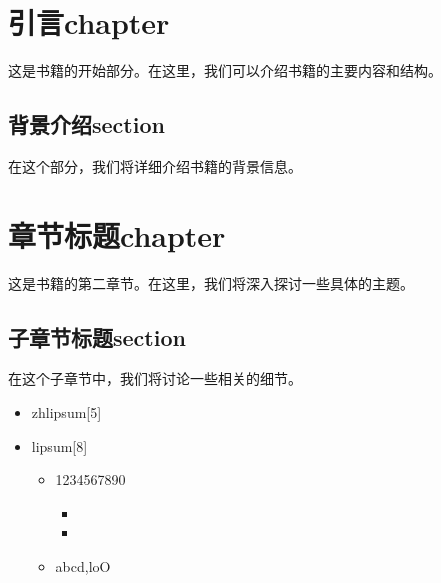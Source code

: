 \documentclass{styles/kaobok2}
\begin{document}
\setlength{\textheight}{230\hscale} %

\etocclasstocstyle %
\etocstandardlines %

\tableofcontents %

\listoffigures %

\let\cleardoublepage\bigskip
\let\clearpage\bigskip

\listoftables %

\endgroup

\chapter{引言chapter}
这是书籍的开始部分。在这里，我们可以介绍书籍的主要内容和结构。

\lipsum[1] %

\zhlipsum[1]

\section{背景介绍section}
在这个部分，我们将详细介绍书籍的背景信息。

\lipsum[2-3] %

\zhlipsum[2]

\chapter{章节标题chapter}
这是书籍的第二章节。在这里，我们将深入探讨一些具体的主题。

\lipsum[4-5] %

\zhlipsum[3]

\section{子章节标题section}
在这个子章节中，我们将讨论一些相关的细节。

\lipsum[6-7] %

\zhlipsum[4]

\begin{itemize}
    \item zhlipsum[5]
    \item lipsum[8]
    \begin{itemize}
        \item 1234567890
        \begin{itemize}
            \item \zhlipsum[5]
            \item \lipsum[8]
        \end{itemize}
        \item abcd,loO
    \end{itemize}
\end{itemize}
\end{document}
